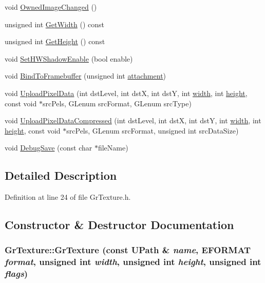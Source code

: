 \begin{CompactItemize}
void \hyperlink{class_gr_texture_4d7fd1aa369f4083de4dee05abc8020b}{OwnedImageChanged} ()
\item 
unsigned int \hyperlink{class_gr_texture_74f19716b3fb47bed8fa89164304ff4a}{GetWidth} () const 
\item 
unsigned int \hyperlink{class_gr_texture_2b073d233b3501d76257589edc417996}{GetHeight} () const 
\item 
void \hyperlink{class_gr_texture_5e10056726037b39e6980e9cd81c984d}{SetHWShadowEnable} (bool enable)
\item 
void \hyperlink{class_gr_texture_c0d44e0f407c06a8c3282e0325faaf87}{BindToFramebuffer} (unsigned int \hyperlink{glext__bak_8h_d8f97111cc6514af5f352219d1cceb40}{attachment})
\item 
void \hyperlink{class_gr_texture_3cd234effbf7e79d1c82031ff842c69c}{UploadPixelData} (int dstLevel, int dstX, int dstY, int \hyperlink{wglext_8h_e6531b1788ca42a9ae8155b0c52e7630}{width}, int \hyperlink{wglext_8h_b2e63df950c3789599e1e43f477bc9e3}{height}, const void $\ast$srcPels, GLenum srcFormat, GLenum srcType)
\item 
void \hyperlink{class_gr_texture_b1deb448c9ae51a1c6b06997e7ffba0f}{UploadPixelDataCompressed} (int dstLevel, int dstX, int dstY, int \hyperlink{wglext_8h_e6531b1788ca42a9ae8155b0c52e7630}{width}, int \hyperlink{wglext_8h_b2e63df950c3789599e1e43f477bc9e3}{height}, const void $\ast$srcPels, GLenum srcFormat, unsigned int srcDataSize)
\item 
void \hyperlink{class_gr_texture_35c6eed25d22b0b360f57c518e2188b4}{DebugSave} (const char $\ast$fileName)
\end{CompactItemize}


\subsection{Detailed Description}


Definition at line 24 of file GrTexture.h.

\subsection{Constructor \& Destructor Documentation}
\hypertarget{class_gr_texture_5f32f1b6d6f4915477b3c7faaa16d709}{
\subsubsection[{GrTexture}]{\setlength{\rightskip}{0pt plus 5cm}GrTexture::GrTexture (const {\bf UPath} \& {\em name}, \/  {\bf EFORMAT} {\em format}, \/  unsigned int {\em width}, \/  unsigned int {\em height}, \/  unsigned int {\em flags})}}
\label{class_gr_texture_5f32f1b6d6f4915477b3c7faaa16d709}




